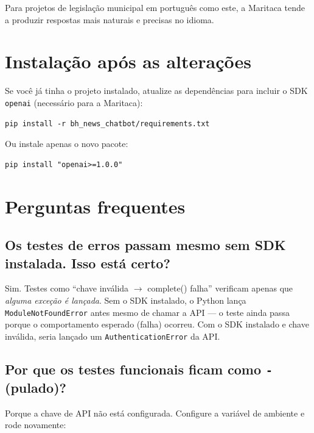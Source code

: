 \documentclass[12pt,a4paper]{article}
\newenvironment{nota}{%
  \begin{mdframed}[backgroundcolor=notecolor,linecolor=noteframe,linewidth=1.5pt,
    leftmargin=0pt,rightmargin=0pt,innerleftmargin=10pt,innerrightmargin=10pt,
    innertopmargin=8pt,innerbottommargin=8pt]
  \small
}{%
  \end{mdframed}
}
\begin{document}
\begin{nota}
Para projetos de legislação municipal em português como este, a Maritaca tende a produzir
respostas mais naturais e precisas no idioma.
\end{nota}

\section{Instalação após as alterações}

Se você já tinha o projeto instalado, atualize as dependências para incluir o SDK
\texttt{openai} (necessário para a Maritaca):

\begin{lstlisting}
pip install -r bh_news_chatbot/requirements.txt
\end{lstlisting}

Ou instale apenas o novo pacote:

\begin{lstlisting}
pip install "openai>=1.0.0"
\end{lstlisting}

\section{Perguntas frequentes}

\subsection{Os testes de erros passam mesmo sem SDK instalada. Isso está certo?}

Sim. Testes como ``chave inválida $\to$ complete() falha'' verificam apenas que
\emph{alguma exceção é lançada}. Sem o SDK instalado, o Python lança
\texttt{ModuleNotFoundError} antes mesmo de chamar a API --- o teste ainda passa porque o
comportamento esperado (falha) ocorreu. Com o SDK instalado e chave inválida, seria lançado
um \texttt{AuthenticationError} da API.

\subsection{Por que os testes funcionais ficam como \texttt{-} (pulado)?}

Porque a chave de API não está configurada. Configure a variável de ambiente e rode
novamente:
\end{document}
